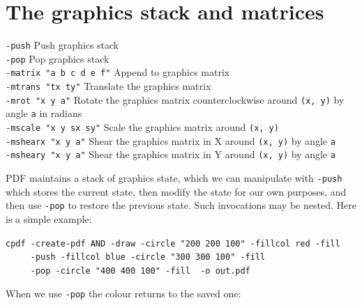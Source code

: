 \documentclass{book}
\begin{document}
\section{The graphics stack and matrices}
  {\small\begin{framed}
   \noindent\verb!-push! Push graphics stack\\
   \noindent\verb!-pop! Pop graphics stack\\
   \noindent\verb!-matrix "a b c d e f"! Append to graphics matrix\\
   \noindent\verb!-mtrans "tx ty"! Translate the graphics matrix\\
   \noindent\verb!-mrot "x y a"! Rotate the graphics matrix counterclockwise around \texttt{(x, y)} by angle \texttt{a} in radians\\
   \noindent\verb!-mscale "x y sx sy"! Scale the graphics matrix around \texttt{(x, y)}\\
   \noindent\verb!-mshearx "x y a"! Shear the graphics matrix in X around \texttt{(x, y)} by angle \texttt{a}\\
   \noindent\verb!-msheary "x y a"! Shear the graphics matrix in Y around \texttt{(x, y)} by angle \texttt{a}
  \end{framed}}

PDF maintains a stack of graphics state, which we can manipulate with \texttt{-push} which stores the current state, then modify the state for our own purposes, and then use \texttt{-pop} to restore the previous state. Such invocations may be nested. Here is a simple example:
 
\begin{framed}
 \noindent\small\verb?cpdf -create-pdf AND -draw -circle "200 200 100" -fillcol red -fill?\\
 \noindent\small\verb?     -push -fillcol blue -circle "300 300 100" -fill?\\
 \noindent\small\verb?     -pop -circle "400 400 100" -fill  -o out.pdf?
\end{framed}

\noindent When we use \texttt{-pop} the colour returns to the saved one:
\end{document}
